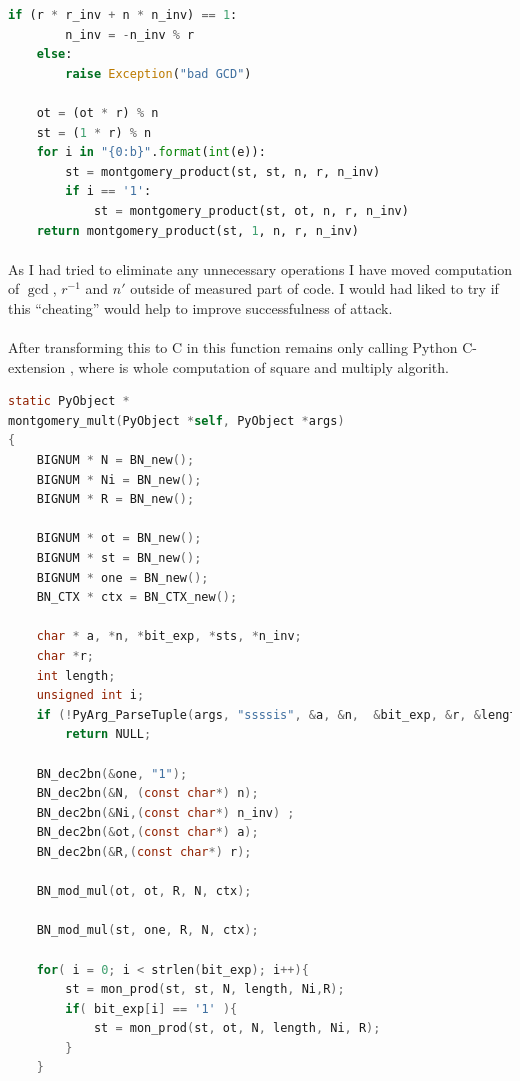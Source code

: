 \documentclass[thesis=B,english]{FITthesis}[2012/10/20]
\begin{document}
{{\begin{minipage}{\linewidth}
\begin{lstlisting}[language=Python]
    if (r * r_inv + n * n_inv) == 1:
        n_inv = -n_inv % r
    else:
        raise Exception("bad GCD")

    ot = (ot * r) % n
    st = (1 * r) % n
    for i in "{0:b}".format(int(e)):
        st = montgomery_product(st, st, n, r, n_inv)
        if i == '1':
            st = montgomery_product(st, ot, n, r, n_inv)
    return montgomery_product(st, 1, n, r, n_inv)
\end{lstlisting}
\end{minipage}

\paragraph*{}{
As I had tried to eliminate any unnecessary operations I have moved computation of \(\gcd\),  \(r^{-1}\) and \(n'\) outside of measured part of code. I would had liked to try if this ``cheating'' would help to improve successfulness of attack.
}

\paragraph*{}{
After transforming this to C in this function remains only calling Python C-extension , where is whole computation of square and multiply algorith.
}

\begin{lstlisting}[language=C]
static PyObject *
montgomery_mult(PyObject *self, PyObject *args)
{
    BIGNUM * N = BN_new();
    BIGNUM * Ni = BN_new();
    BIGNUM * R = BN_new();

    BIGNUM * ot = BN_new();
    BIGNUM * st = BN_new();
    BIGNUM * one = BN_new();
    BN_CTX * ctx = BN_CTX_new();

    char * a, *n, *bit_exp, *sts, *n_inv;
    char *r;
    int length;
    unsigned int i;
    if (!PyArg_ParseTuple(args, "ssssis", &a, &n,  &bit_exp, &r, &length, &n_inv))
        return NULL;

    BN_dec2bn(&one, "1");
    BN_dec2bn(&N, (const char*) n);
    BN_dec2bn(&Ni,(const char*) n_inv) ;
    BN_dec2bn(&ot,(const char*) a);
    BN_dec2bn(&R,(const char*) r);

    BN_mod_mul(ot, ot, R, N, ctx);

    BN_mod_mul(st, one, R, N, ctx);
    
    for( i = 0; i < strlen(bit_exp); i++){
        st = mon_prod(st, st, N, length, Ni,R);
        if( bit_exp[i] == '1' ){
            st = mon_prod(st, ot, N, length, Ni, R);
        }
    }


\end{lstlisting}}}
\end{document}
